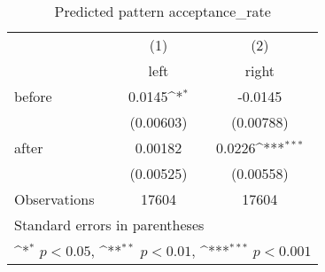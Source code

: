 \begin{table}[htbp]\centering
\def\sym#1{\ifmmode^{#1}\else\(^{#1}\)\fi}
\caption{Predicted pattern acceptance\_rate}
\begin{tabular}{l*{2}{c}}
\hline\hline
                    &\multicolumn{1}{c}{(1)}&\multicolumn{1}{c}{(2)}\\
                    &\multicolumn{1}{c}{left}&\multicolumn{1}{c}{right}\\
\hline
before              &      0.0145\sym{*}  &     -0.0145         \\
                    &   (0.00603)         &   (0.00788)         \\
[1em]
after               &     0.00182         &      0.0226\sym{***}\\
                    &   (0.00525)         &   (0.00558)         \\
\hline
Observations        &       17604         &       17604         \\
\hline\hline
\multicolumn{3}{l}{\footnotesize Standard errors in parentheses}\\
\multicolumn{3}{l}{\footnotesize \sym{*} \(p<0.05\), \sym{**} \(p<0.01\), \sym{***} \(p<0.001\)}\\
\end{tabular}
\end{table}
